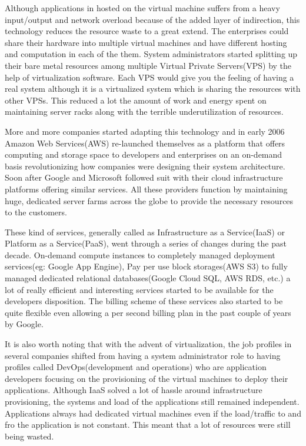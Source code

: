 \documentclass[12pt,titlepage]{article}
\begin{document}
Although applications in hosted on the virtual machine suffers from a heavy
input/output and network overload because of the added layer of indirection,
this technology reduces the resource waste to a great extend. The enterprises could share their hardware into
multiple virtual machines and have different hosting and computation in each of
the them. System administrators started splitting up their bare metal resources
among multiple Virtual Private Servers(VPS) by the help of virtualization
software. Each VPS would give you the feeling
of having a real system although it is a virtualized system which is sharing the
resources with other VPSs. This reduced a lot the amount of work and energy spent on
maintaining server racks along with the terrible underutilization of resources.

More and more companies started adapting this technology and in early 2006
Amazon Web Services(AWS) re-launched themselves as a platform that offers
computing and storage space to developers and enterprises on an on-demand basis
revolutionizing how companies were designing their system architecture. Soon
after Google and Microsoft followed suit with their cloud infrastructure
platforms offering similar services. All these providers function by maintaining
huge, dedicated server farms across the globe to provide the necessary resources
to the customers.

These kind of services, generally called as Infrastructure as a Service(IaaS) or
Platform as a Service(PaaS), went through a
series of changes during the past decade. On-demand compute instances to
completely managed deployment services(eg: Google App Engine), Pay per use block
storages(AWS S3) to fully managed dedicated relational databases(Google Cloud
SQL, AWS RDS, etc.) a lot of really efficient and interesting services started
to be available for the developers disposition. The billing scheme of these
services also started to be quite flexible even allowing a per second billing
plan in the past couple of years by Google.

It is also worth noting that with the advent of virtualization, the job profiles
in several companies shifted from having a system administrator role to 
having profiles called DevOps(development and
operations) who are application developers focusing on the provisioning of the
virtual machines to deploy their applications. Although IaaS solved a lot of
hassle around infrastructure provisioning, the systems and load of the
applications still remained independent. Applications always had dedicated virtual machines
even if the load/traffic to and fro the application is not constant. This meant that a
lot of resources were still being wasted.
\end{document}
